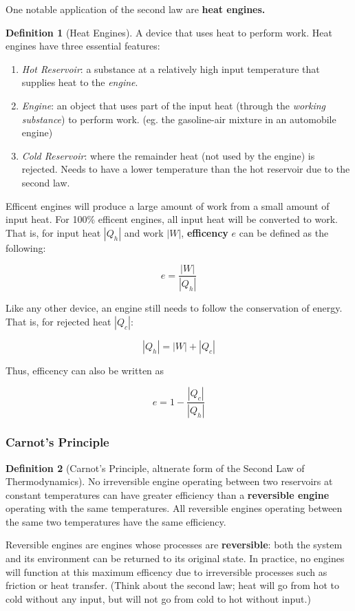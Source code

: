 \documentclass[12pt, a4paper]{article}
\theoremstyle{definition}
\newtheorem{definition}{Definition}
\begin{document}
One notable application of the second law are \textbf{heat engines.}
\begin{definition}[Heat Engines]
    A device that uses heat to perform work.
    Heat engines have three essential features:
    \begin{enumerate}
        \item \textit{Hot Reservoir}: a substance at a relatively high input temperature that supplies heat to the \textit{engine}.
        \item \textit{Engine}: an object that uses part of the input heat (through the \textit{working substance}) to perform work. (eg. the gasoline-air mixture in an automobile engine)
        \item \textit{Cold Reservoir}: where the remainder heat (not used by the engine) is rejected. Needs to have a lower temperature than the hot reservoir due to the second law.
    \end{enumerate}
\end{definition}

Efficent engines will produce a large amount of work from a small amount of input heat.
For 100\% efficent engines, all input heat will be converted to work.
That is, for input heat $|Q_h|$ and work $|W|$, \textbf{efficency} $e$ can be defined as the following:

\[e = \frac{|W|}{|Q_h|}\]

Like any other device, an engine still needs to follow the conservation of energy.
That is, for rejected heat $|Q_c|$:

\[|Q_h| = |W| + |Q_c|\]

Thus, efficency can also be written as

\[e = 1 - \frac{|Q_c|}{|Q_h|}\]

\subsubsection{Carnot's Principle}
\begin{definition}[Carnot's Principle, altnerate form of the Second Law of Thermodynamics]
    No irreversible engine operating between two reservoirs at constant temperatures can have greater efficiency than a \textbf{reversible engine} operating with the same temperatures.
    All reversible engines operating between the same two temperatures have the same efficiency.
\end{definition}


Reversible engines are engines whose processes are \textbf{reversible}: both the system and its environment can be returned to its original state.
In practice, no engines will function at this maximum efficency due to irreversible processes such as friction or heat transfer.
(Think about the second law; heat will go from hot to cold without any input, but will not go from cold to hot without input.)
\end{document}
